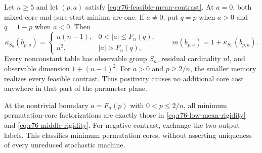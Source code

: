 \begin{corollary}
\label{thm:r76-mean-contrast}
Let $n\ge5$ and let $(p,a)$ satisfy
\eqref{eq:r76-feasible-mean-contrast}. At $a=0$, both mixed-core and
pure-start minima are one. If $a\ne0$, put $q=p$ when $a>0$ and
$q=1-p$ when $a<0$. Then
\begin{equation}\label{eq:r76-full-memory-law}
 \kappa_{S_n}(b_{p,a})=
 \begin{cases}
 n(n-1),&0<|a|\le F_n(q),\\
 n^2,&|a|>F_n(q),
 \end{cases}
 \qquad m(b_{p,a})=1+\kappa_{S_n}(b_{p,a}).
\end{equation}
Every nonconstant table has observable group $S_n$, residual cardinality
$n!$, and observable dimension $1+(n-1)^2$.
For $a>0$ and $p\ge2/n$, the smaller memory realizes every feasible
contrast. Thus positivity causes no additional core cost anywhere in
that part of the parameter plane.

At the nontrivial boundary $a=F_n(p)$ with $0<p\le2/n$, all
minimum permutation-core factorizations are exactly those in
\eqref{eq:r76-low-mean-rigidity} and \eqref{eq:r76-middle-rigidity}.
For negative contrast, exchange the two output labels. This classifies
minimum permutation cores, without asserting uniqueness of every
unreduced stochastic machine.
\end{corollary}

